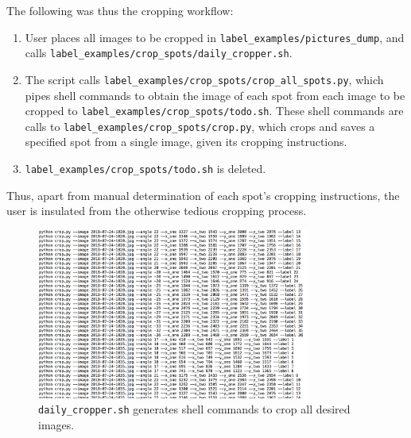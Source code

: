 \documentclass[a4paper, 11pt]{article} %
\begin{document}
		\hspace*{-6mm}The following was thus the cropping workflow:
		\begin{enumerate}
			\item User places all images to be cropped in \texttt{label\_examples/pictures\_dump}, and calls
			\texttt{label\_examples/crop\_spots/daily\_cropper.sh}. 
			\item The script calls \texttt{label\_examples/crop\_spots/crop\_all\_spots.py}, which pipes
			shell commands to obtain the image of each spot from each image to 
			be cropped to
			\texttt{label\_examples/crop\_spots/todo.sh}. These shell commands are calls to
			\texttt{label\_examples/crop\_spots/crop.py}, which crops and saves a specified spot from a
			single image, given its cropping instructions.
			\item \texttt{label\_examples/crop\_spots/todo.sh} is deleted.
		\end{enumerate}
		Thus, apart from manual determination of each spot's cropping instructions, the user is insulated from
		the otherwise tedious cropping process.
		\begin{figure}[H]
			\centering
			\includegraphics[width=0.8\textwidth]{figures/daily_cropper_example}
			\caption{\texttt{daily\_cropper.sh} generates shell commands to 
			crop all desired images.}
		\end{figure}
\end{document}
